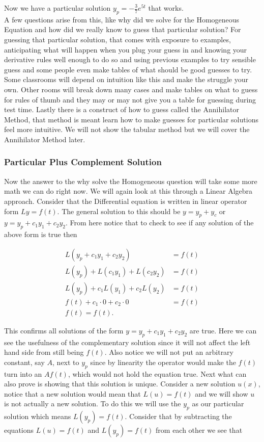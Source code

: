 \documentclass[12pt]{article}
\begin{document}
Now we have a particular solution $y_p=-\frac{3}{7}e^{5t}$ that works. \\

A few questions arise from this, like why did we solve for the Homogeneous Equation and how did we really know to guess that particular solution? For guessing that particular solution, that comes with exposure to examples, anticipating what will happen when you plug your guess in and knowing your derivative rules well enough to do so and using previous examples to try sensible guess and some people even make tables of what should be good guesses to try. \\

Some classrooms will depend on intuition like this and make the struggle your own. Other rooms will break down many cases and make tables on what to guess for rules of thumb and they may or may not give you a table for guessing during test time. Lastly there is a construct of how to guess called the Annihilator Method, that method is meant learn how to make guesses for particular solutions feel more intuitive. We will not show the tabular method but we will cover the Annihilator Method later. \\

\subsubsection{Particular Plus Complement Solution}

Now the answer to the why solve the Homogeneous question will take some more math we can do right now. We will again look at this through a Linear Algebra approach. Consider that the Differential equation is written in linear operator form $Ly=f(t)$. The general solution to this should be $y=y_p+y_c$ or $y=y_p+c_1y_1+c_2y_2$. From here notice that to check to see if any solution of the above form is true then

\begin{align*}
    L(y_p + c_1y_1+c_2y_2)&=f(t) \\
    L(y_p)+L(c_1y_1)+L(c_2y_2)&=f(t) \\
    L(y_p)+c_1L(y_1)+c_2L(y_2)&=f(t) \\
    f(t)+c_1 \cdot 0+c_2 \cdot 0&=f(t) \\
    f(t) = f(t).
\end{align*}

This confirms all solutions of the form $y=y_p+c_1y_1+c_2y_2$ are true. Here we can see the usefulness of the complementary solution since it will not affect the left hand side from still being $f(t)$. Also notice we will not put an arbitrary constant, say $A$, next to $y_p$ since by linearity the operator would make the $f(t)$ turn into an $Af(t)$, which would not hold the equation true. Next what can also prove is showing that this solution is unique. Consider a new solution $u(x)$, notice that a new solution would mean that $L(u)=f(t)$ and we will show $u$ is not actually a new solution. To do this we will use the $y_p$ as our particular solution which means $L(y_p)=f(t)$. Consider that by subtracting the equations $L(u)=f(t)$ and $L(y_p)=f(t)$ from each other we see that
\end{document}
